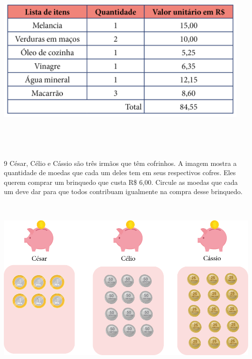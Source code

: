 \includegraphics[width=5.00000in,height=3.80208in]{media/image75.png}


\num{9} César, Célio e Cássio são três irmãos que têm cofrinhos. A
imagem mostra a quantidade de moedas que cada um deles tem em
seus respectivos cofres. Eles querem comprar um brinquedo que custa R\$ 6,00.
Circule as moedas que cada um deve dar para que todos contribuam
igualmente na compra desse brinquedo.


\includegraphics[width=6.14583in,height=3.61068in]{media/image76.png}

